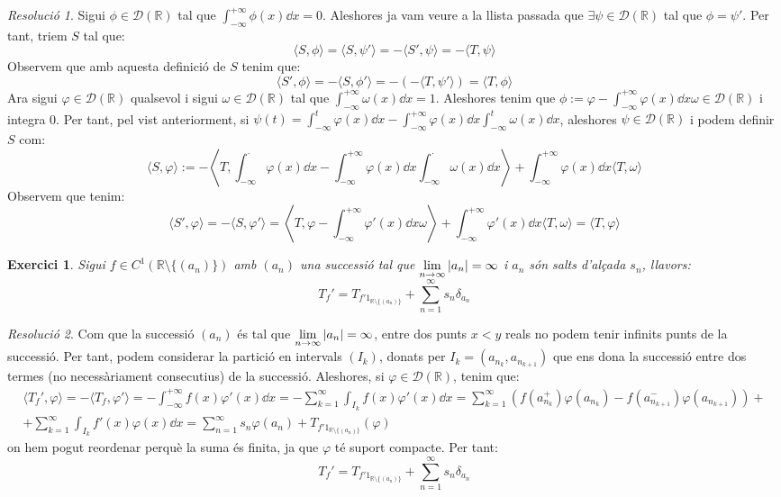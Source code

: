 \documentclass[10pt,a4paper]{article}
\newcommand{\RR}{\ensuremath{\mathbb{R}}} %
\newcommand{\vf}[1]{\boldsymbol{\mathrm{#1}}} %
\newtheorem{exercici}{Exercici}
\theoremstyle{definition}
\theoremstyle{remark}
\newtheorem*{res}{Resolució}
\begin{document}
\begin{res}
  Sigui $\phi\in\mathcal{D}(\RR)$ tal que $\int_{-\infty}^{+\infty}\phi(x) \dd{x}=0$. Aleshores ja vam veure a la llista passada que $\exists\psi\in \mathcal{D}(\RR)$ tal que $\phi=\psi'$. Per tant, triem $S$ tal que:
  $$
    \langle S,\phi\rangle = \langle S,\psi'\rangle = -\langle S',\psi\rangle = -\langle T,\psi\rangle
  $$
  Observem que amb aquesta definició de $S$ tenim que:
  $$
    \langle S',\phi\rangle = - \langle S, \phi'\rangle =-(-\langle T, \psi' \rangle) = \langle T, \phi \rangle
  $$
  Ara sigui $\varphi\in\mathcal{D}(\RR)$ qualsevol i sigui $\omega\in \mathcal{D}(\RR)$ tal que $\int_{-\infty}^{+\infty}\omega(x) \dd{x}=1$.
  Aleshores tenim que $\phi:=\varphi-\int_{-\infty}^{+\infty}\varphi(x) \dd{x}\omega\in\mathcal{D}(\RR)$ i integra 0. Per tant, pel vist anteriorment, si $\psi(t)=\int_{-\infty}^{t}\varphi(x)\dd{x}-\int_{-\infty}^{+\infty} \varphi(x)\dd{x}\int_{-\infty}^{t}\omega(x)\dd{x}$, aleshores $\psi\in\mathcal{D}(\RR)$ i podem definir $S$ com:
  $$
    \langle S,\varphi \rangle := -\left\langle T, \int_{-\infty}^{\cdot}\varphi(x)\dd{x}-\int_{-\infty}^{+\infty} \varphi(x)\dd{x}\int_{-\infty}^{\cdot}\omega(x)\dd{x} \right\rangle  +\int_{-\infty}^{+\infty}\varphi(x)\dd{x}\langle T,\omega\rangle
  $$
  Observem que tenim:
  $$
    \langle S',\varphi \rangle = -\langle S,\varphi' \rangle = \left\langle T,\varphi-\int_{-\infty}^{+\infty} \varphi'(x)\dd{x}\omega \right\rangle +\int_{-\infty}^{+\infty}\varphi'(x)\dd{x}\langle T,\omega\rangle= \langle T,\varphi \rangle
  $$
\end{res}
\begin{exercici}
  Sigui $f\in C^1(\RR\setminus\{(a_n)\})$ amb $(a_n)$ una successió tal que $\displaystyle \lim_{n\to\infty}\abs{a_n}=\infty$ i $a_n$ són salts d'alçada $s_n$, llavors:
  $$
    T_f'=T_{f'\vf{1}_{\RR\setminus\{(a_n)\}}}+\sum_{n=1}^\infty s_n\delta_{a_n}
  $$
\end{exercici}
\begin{res}
  Com que la successió $(a_n)$ és tal que $\displaystyle \lim_{n\to\infty}\abs{a_n}=\infty$, entre dos punts $x<y$ reals no podem tenir infinits punts de la successió. Per tant, podem considerar la partició en intervals $(I_k)$, donats per $I_k=(a_{n_k},a_{n_{k+1}})$ que ens dona la successió entre dos termes (no necessàriament consecutius) de la successió. Aleshores, si $\varphi\in\mathcal{D}(\RR)$, tenim que:
  \begin{multline*}
    \langle T_f',\varphi\rangle = -\langle T_f,\varphi'\rangle=-\int_{-\infty}^{+\infty}f(x)\varphi'(x) \dd{x}=-\sum_{k=1}^\infty \int_{I_k} f(x) \varphi'(x)\dd{x} = \sum_{k=1}^\infty \left( f(a_{n_k}^+)\varphi(a_{n_k})-f(a_{n_{k+1}}^-)\varphi(a_{n_{k+1}})\right) +\\+ \sum_{k=1}^\infty \int_{I_k} f'(x) \varphi(x)\dd{x} =\sum_{n=1}^\infty s_n \varphi(a_n) + T_{f'\vf{1}_{\RR\setminus\{(a_n)\}}}(\varphi)
  \end{multline*}
  on hem pogut reordenar perquè la suma és finita, ja que $\varphi$ té suport compacte. Per tant:
  $$
    T_f'=T_{f'\vf{1}_{\RR\setminus\{(a_n)\}}}+\sum_{n=1}^\infty s_n\delta_{a_n}
  $$
\end{res}
\end{document}
